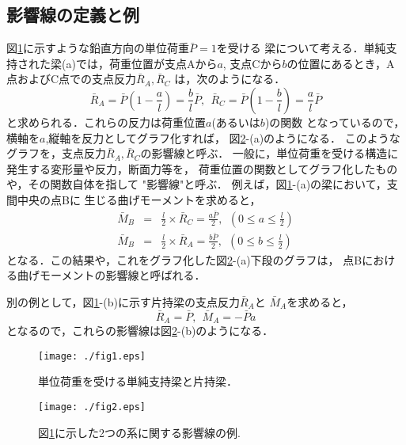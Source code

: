 \documentclass[10pt,a4j]{jarticle}
\begin{document}
\subsection{影響線の定義と例}
図\ref{fig:fig13_1}に示すような鉛直方向の単位荷重$\bar P=1$を受ける
梁について考える．単純支持された梁(a)では，荷重位置が支点Aから$a$,
支点Cから$b$の位置にあるとき，A点およびC点での支点反力$\bar{R}_A,\bar{R}_C$
は，次のようになる．
\begin{equation}
	\bar R_A =  \bar{P}\left( 1-\frac{a}{l}\right)
	=
	\frac{b}{l}
	\bar{P}
	, \ \ 
	\bar R_C =  \bar{P}\left( 1-\frac{b}{l}\right)
	= \frac{a}{l} \bar{P}
	\label{eqn:Rbar_1}
\end{equation}
と求められる．これらの反力は荷重位置$a$(あるいは$b$)の関数
となっているので，横軸を$a$,縦軸を反力としてグラフ化すれば，
図\ref{fig:fig13_2}-(a)のようになる．
このようなグラフを，支点反力$\bar{R}_A,\bar{R}_C$の影響線と呼ぶ．
一般に，単位荷重を受ける構造に発生する変形量や反力，断面力等を，
荷重位置の関数としてグラフ化したものや，その関数自体を指して
"影響線"と呼ぶ．
例えば，図\ref{fig:fig13_1}-(a)の梁において，支間中央の点Bに
生じる曲げモーメントを求めると，
\begin{eqnarray}
	\bar{M}_B &=& \frac{l}{2}\times \bar{R}_C=\frac{a\bar P }{2}
	, \ \ \left( 0 \leq a \leq \frac{l}{2} \right) \\
	\bar{M}_B &=& \frac{l}{2}\times \bar{R}_A=\frac{b\bar P }{2}
	, \ \ \left( 0 \leq b \leq \frac{l}{2} \right) 
\end{eqnarray}
となる．この結果や，これをグラフ化した図\ref{fig:fig13_2}-(a)下段のグラフは，
点Bにおける曲げモーメントの影響線と呼ばれる．

別の例として，図\ref{fig:fig13_1}-(b)に示す片持梁の支点反力$\bar R_A$と
$\bar M_A$を求めると，
\begin{equation}
	\bar{R}_A=\bar{P}, \ \ 
	\bar{M}_A=-\bar{P} a
	\label{eqn:Mbar_2}
\end{equation}
となるので，これらの影響線は図\ref{fig:fig13_2}-(b)のようになる．
\begin{figure}[h]
	\begin{center}
	\texttt{[image: ./fig1.eps]} 
	\end{center}
	\caption{
		単位荷重を受ける単純支持梁と片持梁．
	} 
	\label{fig:fig13_1}
\end{figure}
\begin{figure}[h]
	\begin{center}
	\texttt{[image: ./fig2.eps]} 
	\end{center}
	\caption{
		図\ref{fig:fig13_1}に示した2つの系に関する影響線の例.
	} 
	\label{fig:fig13_2}
\end{figure}
\end{document}
